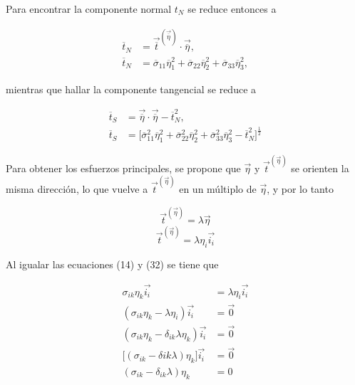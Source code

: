 \documentclass{article}
\begin{document}
    Para encontrar la componente normal $t_{N}$ se reduce entonces a

    \begin{align}
        \overline{t}_{N} &= \vec{\overline{t}}^{(\vec{\overline{\eta}})} \cdot \vec{\overline{\eta}},\\
        \overline{t}_{N} &= \overline{\sigma}_{11}\overline{\eta}_{1}^2 +
                            \overline{\sigma}_{22}\overline{\eta}_{2}^2 +
                            \overline{\sigma}_{33}\overline{\eta}_{3}^2,
    \end{align}

    mientras que hallar la componente tangencial se reduce a

    \begin{align}
        \overline{t}_{S} &= \vec{\overline{\eta}} \cdot \vec{\overline{\eta}} - \overline{t}_{N}^2, \\
        \overline{t}_{S} &= \lbrack
        \overline{\sigma}_{11}^2\overline{\eta}_{1}^2 +
        \overline{\sigma}_{22}^2\overline{\eta}_{2}^2 +
        \overline{\sigma}_{33}^2\overline{\eta}_{3}^2 -
        \overline{t}_{N}^2
        \rbrack^\frac{1}{2}
    \end{align}

    Para obtener los esfuerzos principales, se propone que $\vec{\eta}$ y $\vec{t}^{(\vec{\eta})}$ se orienten
    la misma direcci\'{o}n, lo que vuelve a $\vec{t}^{(\vec{\eta})}$ en un m\'{u}ltiplo de $\vec{\eta}$, y por
    lo tanto

    \begin{equation}
        \vec{t}^{(\vec{\eta})} = \lambda\vec{\eta}
    \end{equation}
    \begin{equation}
        \vec{t}^{(\vec{\eta})} = \lambda\eta_{i}\vec{i_{i}}
    \end{equation}

    Al igualar las ecuaciones (14) y (32) se tiene que

    \begin{align}
        \sigma_{ik}\eta_{k}\vec{i_{i}} &= \lambda\eta_{i}\vec{i_{i}}\\
        (\sigma_{ik}\eta_{k} - \lambda\eta_{i})\vec{i_{i}} &= \vec{0}\\
        (\sigma_{ik}\eta_{k} - \delta_{ik}\lambda\eta_{k})\vec{i_{i}} &= \vec{0}\\
        \lbrack ( \sigma_{ik} - \delta{ik}\lambda )\eta_{k} \rbrack\vec{i_{i}} &= \vec{0}\\
        (\sigma_{ik} - \delta_{ik}\lambda)\eta_{k} &= 0
    \end{align}
\end{document}
